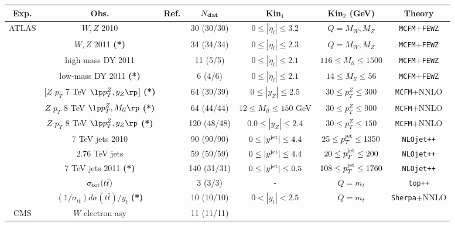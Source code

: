 \begin{table}[ht]
\scriptsize
\begin{centering}
   \renewcommand{\arraystretch}{1.4}
\begin{tabular}{|c|c|c|c|c|c|c|}
  \hline
  {Exp.} & Obs. & {Ref.}  & $ N_{\rm \bf dat}$  & Kin$_1$  &  Kin$_2$ (GeV) & Theory \tabularnewline
\hline
\hline
\multirow{12}{*}{ATLAS} &   $W,Z$ 2010 & \cite{Aad:2011dm}  &  30 (30/30) & $ 0 \le |\eta_l| \le 3.2$ & $Q=M_W, M_Z$ &
{\tt MCFM}+{\tt FEWZ}\tabularnewline
&   $W,Z$ 2011 {\bf (*)}  & \cite{Aaboud:2016btc}  & 34 (34/34)   & $0 \le |\eta_l| \le 2.3$   & $Q=M_W, M_Z$ &
{\tt MCFM}+{\tt FEWZ}\tabularnewline
&    high-mass DY 2011 & \cite{Aad:2013iua}  & 11 (5/5) & $0 \le |\eta_l| \le 2.1$ & $ 116 \le M_{ll} \le 1500$  &
{\tt MCFM}+{\tt FEWZ} \tabularnewline
&    low-mass DY 2011 {\bf (*)}   & \cite{Aad:2014qja}  & 6 (4/6)  & $0 \le  |\eta_l| \le 2.1$  & $  14 \le M_{ll} \le 56  $  &
{\tt MCFM}+{\tt FEWZ}
\tabularnewline
&    [$Z$ $p_T$ 7 TeV $\lp p_T^Z,y_Z\rp$]  {\bf (*)}  & \cite{Aad:2014xaa}  & 64 (39/39)  &
$0 \le |y_{Z}| \le 2.5$  &  $30 \le p_T^Z \le 300$   & {\tt MCFM}+NNLO
\tabularnewline
&    $Z$ $p_T$ 8 TeV $\lp p_T^Z,M_{ll}\rp$  {\bf (*)}  & \cite{Aad:2015auj}  & 64 (44/44)  &  $  12 \le M_{ll} \le
150 $  GeV & $30 \le p_T^Z \le 900$  & {\tt MCFM}+NNLO
      \tabularnewline
      &    $Z$ $p_T$ 8 TeV $\lp p_T^Z,y_Z\rp$  {\bf (*)}  & \cite{Aad:2015auj}  & 120 (48/48)  & $   0.0\le |y_{Z}| \le 2.4  $  
        & $   30\le p_{T}^Z \le 150  $  &
          {\tt MCFM}+NNLO
            \tabularnewline
&    7 TeV jets 2010 & \cite{Aad:2011fc}  & 90 (90/90) &
$0 \le |y^{\rm jet}| \le 4.4 $ & $ 25 \le p_T^{\rm jet} \le 1350 $&
{\tt NLOjet++}
\tabularnewline
&      2.76 TeV jets  &  \cite{Aad:2013lpa}  &
59 (59/59) & $0 \le |y^{\rm jet}| \le 4.4$ & $20 \le p_T^{\rm jet} \le 200$ & {\tt NLOjet++}
\tabularnewline
&      7 TeV jets 2011 {\bf (*)}  &  \cite{Aad:2014vwa}  & 140 (31/31)
  & $ 0 \le |y^{\rm jet}| \le 0.5  $ & $108 \le p_T^{\rm jet} \le 1760 $ & {\tt NLOjet++}
\tabularnewline
  &    $\sigma_{\rm tot}(t\bar{t})$  & \cite{Aad:2014kva,Aaboud:2016pbd}& 
3 (3/3) & - & $Q=m_t$ & {\tt top++} \tabularnewline
 &    $(1/\sigma_{t\bar{t}})d\sigma(t\bar{t})/y_t$  {\bf (*)}   & \cite{Aad:2015mbv}& 
10 (10/10)  & $0<|y_t|<2.5$ & $Q=m_t$ & {\tt Sherpa}+NNLO \tabularnewline
 \hline
 \hline
\multirow{12}{*}{CMS} &   $W$ electron asy & \cite{Chatrchyan:2012xt}  &  11 (11/11) &

\end{tabular}
\end{centering}
\end{table}
